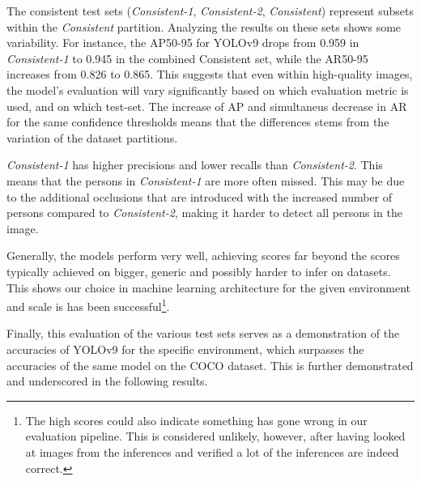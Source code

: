 The consistent test sets (\textit{Consistent-1}, \textit{Consistent-2}, \textit{Consistent}) represent subsets within the \textit{Consistent} partition. Analyzing the results on these sets shows some variability. For instance, the AP50-95 for YOLOv9 drops from 0.959 in \textit{Consistent-1} to 0.945 in the combined Consistent set, while the AR50-95 increases from 0.826 to 0.865. This suggests that even within high-quality images, the model's evaluation will vary significantly based on which evaluation metric is used, and on which test-set. The increase of AP and simultaneus decrease in AR for the same confidence thresholds means that the differences stems from the variation of the dataset partitions. 

\textit{Consistent-1} has higher precisions and lower recalls than \textit{Consistent-2}. This means that the persons in \textit{Consistent-1} are more often missed. This may be due to the additional occlusions that are introduced with the increased number of persons compared to \textit{Consistent-2}, making it harder to detect all persons in the image. 

Generally, the models perform very well, achieving scores far beyond the scores typically achieved on bigger, generic and possibly harder to infer on datasets. This shows our choice in machine learning architecture for the given environment and scale is has been successful\footnote{The high scores could also indicate something has gone wrong in our evaluation pipeline. This is considered unlikely, however, after having looked at images from the inferences and verified a lot of the inferences are indeed correct.}. 

Finally, this evaluation of the various test sets serves as a demonstration of the accuracies of YOLOv9 for the specific environment, which surpasses the accuracies of the same model on the COCO dataset. This is further demonstrated and underscored in the following results.

